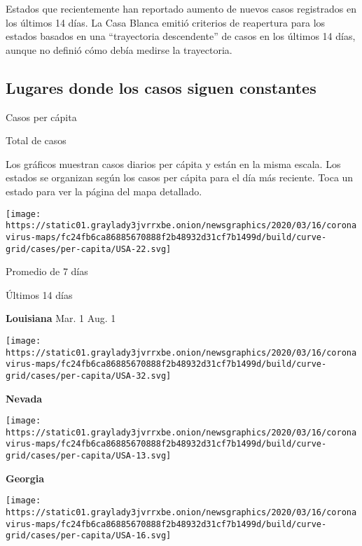 Estados que recientemente han reportado aumento de nuevos casos
registrados en los últimos 14 días. La Casa Blanca emitió criterios de
reapertura para los estados basados en una ``trayectoria descendente''
de casos en los últimos 14 días, aunque no definió cómo debía medirse la
trayectoria.

\hypertarget{lugares-donde-los-casos-siguen-constantes}{%
\subsection{Lugares donde los casos siguen
constantes}\label{lugares-donde-los-casos-siguen-constantes}}

Casos per cápita

Total de casos

Los gráficos muestran casos diarios per cápita y están en la misma
escala. Los estados se organizan según los casos per cápita para el día
más reciente. Toca un estado para ver la página del mapa detallado.

\href{https://www.nytimes3xbfgragh.onion/interactive/2020/us/louisiana-coronavirus-cases.html}{}

\texttt{[image: https://static01.graylady3jvrrxbe.onion/newsgraphics/2020/03/16/coronavirus-maps/fc24fb6ca86885670888f2b48932d31cf7b1499d/build/curve-grid/cases/per-capita/USA-22.svg]}

Promedio de 7 días

Últimos 14 días

\textbf{Louisiana} Mar. 1 Aug. 1

\href{https://www.nytimes3xbfgragh.onion/interactive/2020/us/nevada-coronavirus-cases.html}{}

\texttt{[image: https://static01.graylady3jvrrxbe.onion/newsgraphics/2020/03/16/coronavirus-maps/fc24fb6ca86885670888f2b48932d31cf7b1499d/build/curve-grid/cases/per-capita/USA-32.svg]}

\textbf{Nevada}

\href{https://www.nytimes3xbfgragh.onion/interactive/2020/us/georgia-coronavirus-cases.html}{}

\texttt{[image: https://static01.graylady3jvrrxbe.onion/newsgraphics/2020/03/16/coronavirus-maps/fc24fb6ca86885670888f2b48932d31cf7b1499d/build/curve-grid/cases/per-capita/USA-13.svg]}

\textbf{Georgia}

\href{https://www.nytimes3xbfgragh.onion/interactive/2020/us/idaho-coronavirus-cases.html}{}

\texttt{[image: https://static01.graylady3jvrrxbe.onion/newsgraphics/2020/03/16/coronavirus-maps/fc24fb6ca86885670888f2b48932d31cf7b1499d/build/curve-grid/cases/per-capita/USA-16.svg]}

